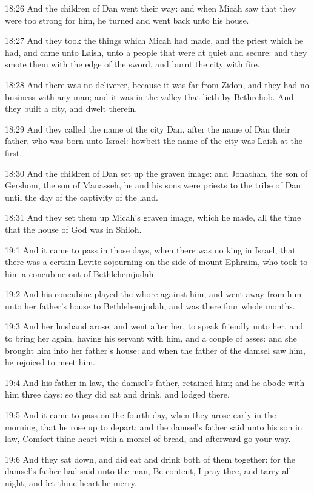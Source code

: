 18:26 And the children of Dan went their way: and when Micah saw that
they were too strong for him, he turned and went back unto his house.

18:27 And they took the things which Micah had made, and the priest
which he had, and came unto Laish, unto a people that were at quiet
and secure: and they smote them with the edge of the sword, and burnt
the city with fire.

18:28 And there was no deliverer, because it was far from Zidon, and
they had no business with any man; and it was in the valley that lieth
by Bethrehob. And they built a city, and dwelt therein.

18:29 And they called the name of the city Dan, after the name of Dan
their father, who was born unto Israel: howbeit the name of the city
was Laish at the first.

18:30 And the children of Dan set up the graven image: and Jonathan,
the son of Gershom, the son of Manasseh, he and his sons were priests
to the tribe of Dan until the day of the captivity of the land.

18:31 And they set them up Micah's graven image, which he made, all
the time that the house of God was in Shiloh.

19:1 And it came to pass in those days, when there was no king in
Israel, that there was a certain Levite sojourning on the side of
mount Ephraim, who took to him a concubine out of Bethlehemjudah.

19:2 And his concubine played the whore against him, and went away
from him unto her father's house to Bethlehemjudah, and was there four
whole months.

19:3 And her husband arose, and went after her, to speak friendly unto
her, and to bring her again, having his servant with him, and a couple
of asses: and she brought him into her father's house: and when the
father of the damsel saw him, he rejoiced to meet him.

19:4 And his father in law, the damsel's father, retained him; and he
abode with him three days: so they did eat and drink, and lodged
there.

19:5 And it came to pass on the fourth day, when they arose early in
the morning, that he rose up to depart: and the damsel's father said
unto his son in law, Comfort thine heart with a morsel of bread, and
afterward go your way.

19:6 And they sat down, and did eat and drink both of them together:
for the damsel's father had said unto the man, Be content, I pray
thee, and tarry all night, and let thine heart be merry.

